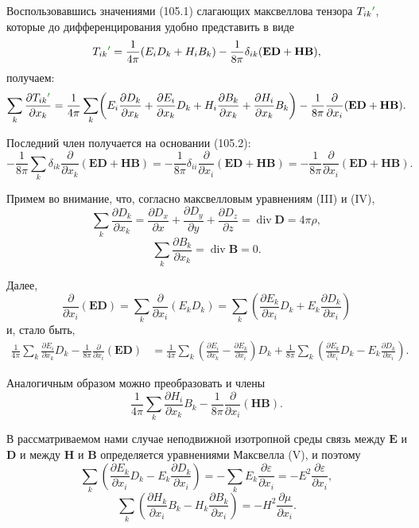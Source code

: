 \documentclass[a4paper,10pt]{article}
\newcommand{\modtext}[1]{\textcolor{modcolor}{#1}}
\newcommand{\modmath}[1]{\textcolor{modcolor}{#1}}
\begin{document}
Воспользовавшись значениями (105.1) слагающих \modtext{максвеллова
тензора} $T_{ik}\modmath{'}$, которые до
дифференцирования удобно представить в виде
$$
    T_{ik}\modmath{'} = \frac{1}{4\pi}(E_i D_k + H_i B_k)
           - \frac{1}{8\pi}\delta_{ik}(\mathbf{ED} + \mathbf{HB}),
$$
получаем:
$$
    \sum_k\frac{\partial T_{ik}\modmath{'}}{\partial x_k}
    = \frac{1}{4\pi}\sum_k\!\left(
        E_i\frac{\partial D_k}{\partial x_k}
      + \frac{\partial E_i}{\partial x_k}D_k
      + H_i\frac{\partial B_k}{\partial x_k}
      + \frac{\partial H_i}{\partial x_k}B_k
    \right)
    - \frac{1}{8\pi}\frac{\partial}{\partial x_i}(\mathbf{ED} + \mathbf{HB}).
$$

Последний член получается на основании (105.2):
$$
    -\frac{1}{8\pi}\sum_k\delta_{ik}\frac{\partial}{\partial x_k}(\mathbf{ED} + \mathbf{HB})
    = -\frac{1}{8\pi}\delta_{ii}\frac{\partial}{\partial x_i}(\mathbf{ED} + \mathbf{HB})
    = -\frac{1}{8\pi}\frac{\partial}{\partial x_i}(\mathbf{ED} + \mathbf{HB}).
$$


Примем во внимание, что, согласно максвелловым уравнениям (III) и (IV),
$$
    \sum_k\frac{\partial D_k}{\partial x_k}
    = \frac{\partial D_x}{\partial x} + \frac{\partial D_y}{\partial y}
    + \frac{\partial D_z}{\partial z} = \operatorname{div}\mathbf{D} = 4\pi\rho,
$$
$$
    \sum_k\frac{\partial B_k}{\partial x_k} = \operatorname{div}\mathbf{B} = 0.
$$

Далее,
$$
    \frac{\partial}{\partial x_i}(\mathbf{ED})
    = \sum_k\frac{\partial}{\partial x_i}(E_k D_k)
    = \sum_k\!\left(\frac{\partial E_k}{\partial x_i}D_k
    + E_k\frac{\partial D_k}{\partial x_i}\right)
$$
и, стало быть,
\begin{align*}
    \frac{1}{4\pi}\sum_k\frac{\partial E_i}{\partial x_k}D_k
    - \frac{1}{8\pi}\frac{\partial}{\partial x_i}(\mathbf{ED})
    &= \frac{1}{4\pi}\sum_k\!\left(\frac{\partial E_i}{\partial x_k}
     - \frac{\partial E_k}{\partial x_i}\right)D_k
     + \frac{1}{8\pi}\sum_k\!\left(\frac{\partial E_k}{\partial x_i}D_k
     - E_k\frac{\partial D_k}{\partial x_i}\right).
\end{align*}

Аналогичным образом можно преобразовать и члены
$$
    \frac{1}{4\pi}\sum_k\frac{\partial H_i}{\partial x_k}B_k
    - \frac{1}{8\pi}\frac{\partial}{\partial x_i}(\mathbf{HB}).
$$

В рассматриваемом нами случае неподвижной изотропной среды связь
между $\mathbf{E}$ и $\mathbf{D}$ и между $\mathbf{H}$ и $\mathbf{B}$
определяется уравнениями Максвелла (V), и поэтому
$$
    \sum_k\!\left(\frac{\partial E_k}{\partial x_i}D_k
    - E_k\frac{\partial D_k}{\partial x_i}\right)
    = -\sum_k E_k\frac{\partial\varepsilon}{\partial x_i}
    = -E^2\frac{\partial\varepsilon}{\partial x_i},
$$
$$
    \sum_k\!\left(\frac{\partial H_k}{\partial x_i}B_k
    - H_k\frac{\partial B_k}{\partial x_i}\right)
    = -H^2\frac{\partial\mu}{\partial x_i}.
$$
\end{document}
